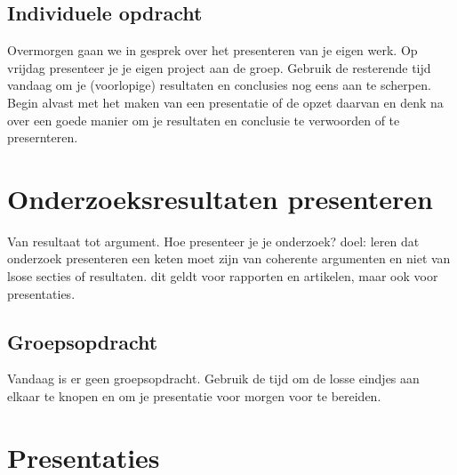 \documentclass[
  letterpaper,
  DIV=11,
  numbers=noendperiod]{scrreprt}
\begin{document}
\section{Individuele opdracht}\label{individuele-opdracht-5}

Overmorgen gaan we in gesprek over het presenteren van je eigen werk. Op
vrijdag presenteer je je eigen project aan de groep. Gebruik de
resterende tijd vandaag om je (voorlopige) resultaten en conclusies nog
eens aan te scherpen. Begin alvast met het maken van een presentatie of
de opzet daarvan en denk na over een goede manier om je resultaten en
conclusie te verwoorden of te presernteren.


\chapter{Onderzoeksresultaten presenteren}\label{sec-mt7}

\begin{tcolorbox}[enhanced jigsaw, arc=.35mm, bottomrule=.15mm, bottomtitle=1mm, breakable, colback=white, colbacktitle=quarto-callout-tip-color!10!white, colframe=quarto-callout-tip-color-frame, coltitle=black, left=2mm, leftrule=.75mm, opacityback=0, opacitybacktitle=0.6, rightrule=.15mm, title=\textcolor{quarto-callout-tip-color}{\faLightbulb}\hspace{0.5em}{Hoorcollege 25 juni 2026}, titlerule=0mm, toprule=.15mm, toptitle=1mm]

Van resultaat tot argument. Hoe presenteer je je onderzoek? doel: leren
dat onderzoek presenteren een keten moet zijn van coherente argumenten
en niet van lsose secties of resultaten. dit geldt voor rapporten en
artikelen, maar ook voor presentaties.

\end{tcolorbox}

\section{Groepsopdracht}\label{groepsopdracht-6}

Vandaag is er geen groepsopdracht. Gebruik de tijd om de losse eindjes
aan elkaar te knopen en om je presentatie voor morgen voor te bereiden.


\chapter{Presentaties}\label{sec-mt8}
\end{document}
